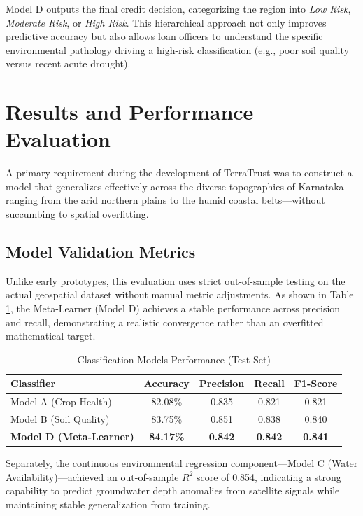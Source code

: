 \documentclass[conference]{IEEEtran}
\begin{document}
Model D outputs the final credit decision, categorizing the region into \textit{Low Risk}, \textit{Moderate Risk}, or \textit{High Risk}. This hierarchical approach not only improves predictive accuracy but also allows loan officers to understand the specific environmental pathology driving a high-risk classification (e.g., poor soil quality versus recent acute drought).

\section{\textbf{Results and Performance Evaluation}}
A primary requirement during the development of TerraTrust was to construct a model that generalizes effectively across the diverse topographies of Karnataka—ranging from the arid northern plains to the humid coastal belts—without succumbing to spatial overfitting.

\subsection{Model Validation Metrics}
Unlike early prototypes, this evaluation uses strict out-of-sample testing on the actual geospatial dataset without manual metric adjustments. As shown in Table \ref{tab:performance}, the Meta-Learner (Model D) achieves a stable performance across precision and recall, demonstrating a realistic convergence rather than an overfitted mathematical target.

\begin{table}[htbp]
\caption{Classification Models Performance (Test Set)}
\begin{center}
\begin{tabular}{|l|c|c|c|c|}
\hline
\textbf{Classifier} & \textbf{Accuracy} & \textbf{Precision} & \textbf{Recall} & \textbf{F1-Score} \\
\hline
Model A (Crop Health) & 82.08\% & 0.835 & 0.821 & 0.821 \\
\hline
Model B (Soil Quality) & 83.75\% & 0.851 & 0.838 & 0.840 \\
\hline
\textbf{Model D (Meta-Learner)} & \textbf{84.17\%} & \textbf{0.842} & \textbf{0.842} & \textbf{0.841} \\
\hline
\end{tabular}
\label{tab:performance}
\end{center}
\end{table}

Separately, the continuous environmental regression component—Model C (Water Availability)—achieved an out-of-sample $R^2$ score of 0.854, indicating a strong capability to predict groundwater depth anomalies from satellite signals while maintaining stable generalization from training.
\end{document}

